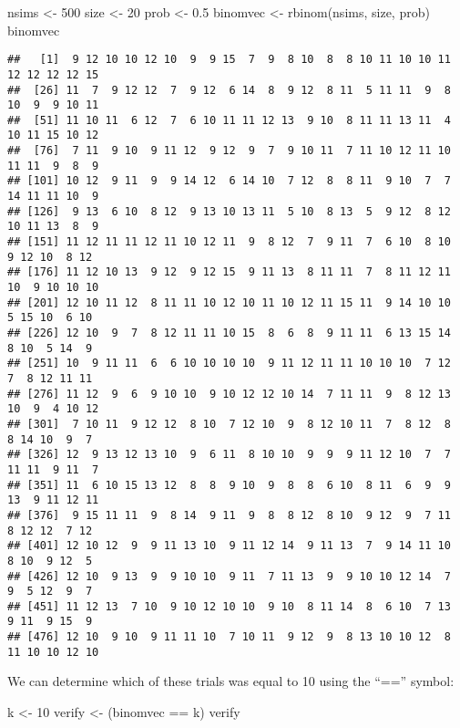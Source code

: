 \documentclass[
]{book}
\newenvironment{Shaded}{\begin{snugshade}}{\end{snugshade}}
\newcommand{\DecValTok}[1]{\textcolor[rgb]{0.00,0.00,0.81}{#1}}
\newcommand{\FloatTok}[1]{\textcolor[rgb]{0.00,0.00,0.81}{#1}}
\newcommand{\FunctionTok}[1]{\textcolor[rgb]{0.00,0.00,0.00}{#1}}
\newcommand{\NormalTok}[1]{#1}
\newcommand{\OtherTok}[1]{\textcolor[rgb]{0.56,0.35,0.01}{#1}}
\newcommand{\SpecialCharTok}[1]{\textcolor[rgb]{0.00,0.00,0.00}{#1}}
\begin{document}
\begin{Shaded}
\begin{Highlighting}[]
\NormalTok{nsims }\OtherTok{\textless{}{-}} \DecValTok{500}
\NormalTok{size }\OtherTok{\textless{}{-}} \DecValTok{20}
\NormalTok{prob }\OtherTok{\textless{}{-}} \FloatTok{0.5}
\NormalTok{binomvec }\OtherTok{\textless{}{-}} \FunctionTok{rbinom}\NormalTok{(nsims, size, prob)}
\NormalTok{binomvec}
\end{Highlighting}
\end{Shaded}

\begin{verbatim}
##   [1]  9 12 10 10 12 10  9  9 15  7  9  8 10  8  8 10 11 10 10 11 12 12 12 12 15
##  [26] 11  7  9 12 12  7  9 12  6 14  8  9 12  8 11  5 11 11  9  8 10  9  9 10 11
##  [51] 11 10 11  6 12  7  6 10 11 11 12 13  9 10  8 11 11 13 11  4 10 11 15 10 12
##  [76]  7 11  9 10  9 11 12  9 12  9  7  9 10 11  7 11 10 12 11 10 11 11  9  8  9
## [101] 10 12  9 11  9  9 14 12  6 14 10  7 12  8  8 11  9 10  7  7 14 11 11 10  9
## [126]  9 13  6 10  8 12  9 13 10 13 11  5 10  8 13  5  9 12  8 12 10 11 13  8  9
## [151] 11 12 11 11 12 11 10 12 11  9  8 12  7  9 11  7  6 10  8 10  9 12 10  8 12
## [176] 11 12 10 13  9 12  9 12 15  9 11 13  8 11 11  7  8 11 12 11 10  9 10 10 10
## [201] 12 10 11 12  8 11 11 10 12 10 11 10 12 11 15 11  9 14 10 10  5 15 10  6 10
## [226] 12 10  9  7  8 12 11 11 10 15  8  6  8  9 11 11  6 13 15 14  8 10  5 14  9
## [251] 10  9 11 11  6  6 10 10 10 10  9 11 12 11 11 10 10 10  7 12  7  8 12 11 11
## [276] 11 12  9  6  9 10 10  9 10 12 12 10 14  7 11 11  9  8 12 13 10  9  4 10 12
## [301]  7 10 11  9 12 12  8 10  7 12 10  9  8 12 10 11  7  8 12  8  8 14 10  9  7
## [326] 12  9 13 12 13 10  9  6 11  8 10 10  9  9  9 11 12 10  7  7 11 11  9 11  7
## [351] 11  6 10 15 13 12  8  8  9 10  9  8  8  6 10  8 11  6  9  9 13  9 11 12 11
## [376]  9 15 11 11  9  8 14  9 11  9  8  8 12  8 10  9 12  9  7 11  8 12 12  7 12
## [401] 12 10 12  9  9 11 13 10  9 11 12 14  9 11 13  7  9 14 11 10  8 10  9 12  5
## [426] 12 10  9 13  9  9 10 10  9 11  7 11 13  9  9 10 10 12 14  7  9  5 12  9  7
## [451] 11 12 13  7 10  9 10 12 10 10  9 10  8 11 14  8  6 10  7 13  9 11  9 15  9
## [476] 12 10  9 10  9 11 11 10  7 10 11  9 12  9  8 13 10 10 12  8 11 10 10 12 10
\end{verbatim}

We can determine which of these trials was equal to 10 using the ``=='' symbol:

\begin{Shaded}
\begin{Highlighting}[]
\NormalTok{k }\OtherTok{\textless{}{-}} \DecValTok{10}
\NormalTok{verify }\OtherTok{\textless{}{-}}\NormalTok{ (binomvec }\SpecialCharTok{==}\NormalTok{ k)}
\NormalTok{verify}
\end{Highlighting}
\end{Shaded}
\end{document}
